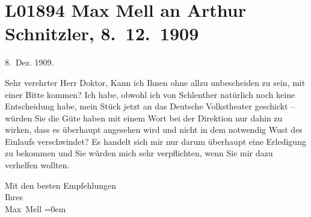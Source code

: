 

\section[Max Mell an Arthur Schnitzler, 8. 12. 1909]{L01894 Max Mell an Arthur Schnitzler, 8. 12. 1909}
\nopagebreak{}
\rehead{ }\normalsize\beginnumbering{}
\toendnotes[C]{\smallbreak\pagebreak[2]}
\toendnotes[C]{\smallbreak}
\pstart
           \raggedleft{}{\pb}8. Dez. 1909.\pend
           
\pstart{}Sehr verehrter Herr Doktor,\pend\vspace{0.5em}
\pstart
           Kann ich Ihnen ohne allzu unbescheiden zu sein, mit einer Bitte kommen? Ich habe,
               obwohl ich von Schlenther natürlich noch keine
               Entscheidung habe, mein Stück
               jetzt an das Deutsche Volkstheater geschickt –
               würden Sie die Güte haben mit einem Wort bei der Direktion nur dahin zu wirken, dass
               es überhaupt angesehen wird und nicht in dem notwendig \label{T_L01894-1v}\label{T_L01894-1} Wust des Einlaufs verschwindet?
               Es handelt sich mir nur darum überhaupt eine Erledigung zu bekommen und Sie würden
               mich sehr verpflichten, wenn Sie mir dazu verhelfen wollten.\pend
           
\pstart
           Mit den besten Empfehlungen{\\[\baselineskip]}Ihres{\\[\baselineskip]}\spacefill\mbox{Max Mell}\pend
           \leftskip=0em{}\endnumbering{}  
      